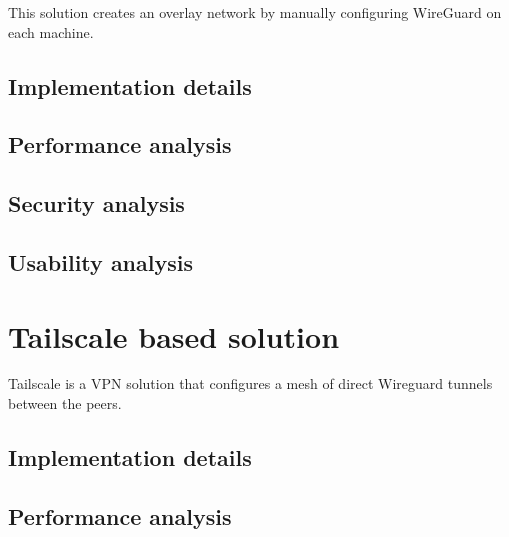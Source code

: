 This solution creates an overlay network by manually configuring
WireGuard on each machine.

\hypertarget{thesis__060-wireguard.md__implementation-details}{%
\section{Implementation
details}\label{thesis__060-wireguard.md__implementation-details}}

\hypertarget{thesis__060-wireguard.md__performance-analysis}{%
\section{Performance
analysis}\label{thesis__060-wireguard.md__performance-analysis}}

\hypertarget{thesis__060-wireguard.md__security-analysis}{%
\section{Security
analysis}\label{thesis__060-wireguard.md__security-analysis}}

\hypertarget{thesis__060-wireguard.md__usability-analysis}{%
\section{Usability
analysis}\label{thesis__060-wireguard.md__usability-analysis}}

\hypertarget{thesis__070-tailscale.md}{}
\hypertarget{thesis__070-tailscale.md__tailscale-based-solution}{%
\chapter{Tailscale based
solution}\label{thesis__070-tailscale.md__tailscale-based-solution}}

Tailscale is a VPN solution that configures a mesh of direct Wireguard
tunnels between the peers.

\hypertarget{thesis__070-tailscale.md__implementation-details}{%
\section{Implementation
details}\label{thesis__070-tailscale.md__implementation-details}}

\hypertarget{thesis__070-tailscale.md__performance-analysis}{%
\section{Performance
analysis}\label{thesis__070-tailscale.md__performance-analysis}}

